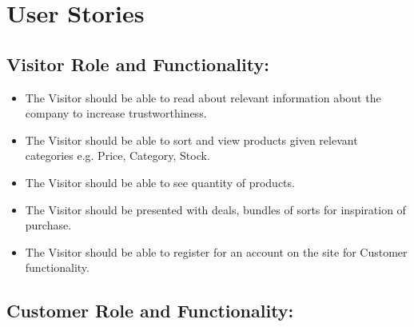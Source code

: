 \newpage

\section{User Stories}\label{app:user_stories}

\subsection{Visitor Role and Functionality:}

\begin{itemize}
    \item The Visitor should be able to read about relevant information
    about the company to increase trustworthiness.
    \item The Visitor should be able to sort and view  products given
    relevant categories e.g. Price, Category, Stock.
    \item The Visitor should be able to see quantity of products. 
    \item The Visitor should be presented with deals, bundles of sorts for
    inspiration of purchase.
    \item The Visitor should be able to register for an account on the site for Customer functionality.
\end{itemize}


\subsection{Customer Role and Functionality:}

